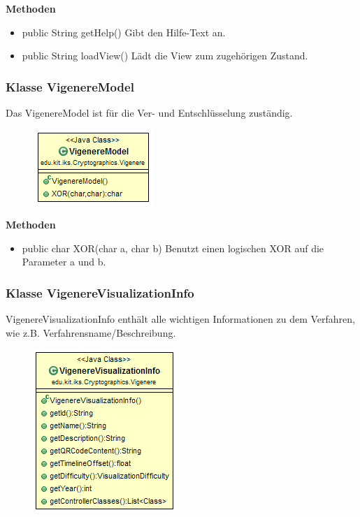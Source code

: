 \documentclass{article}
\begin{document}
      \textbf{Methoden}
      \begin{itemize}
        \item public String getHelp() \newline
        Gibt den Hilfe-Text an.
        \item public String loadView() \newline
        Lädt die View zum zugehörigen Zustand.
      \end{itemize}

    \subsubsection{Klasse VigenereModel}
      Das VigenereModel ist für die Ver- und Entschlüsselung zuständig.
      \begin{figure}[H]
        \centering
        \includegraphics{resources/edu-kit-iks-Cryptographics-Vigenere-VigenereModel}
      \end{figure}
      
      \textbf{Methoden}
      \begin{itemize}
        \item public char XOR(char a, char b) \newline
        Benutzt einen logischen XOR auf die Parameter a und b.
      \end{itemize}

    \subsubsection{Klasse VigenereVisualizationInfo}
      VigenereVisualizationInfo enthält alle wichtigen Informationen zu dem Verfahren, wie z.B. Verfahrensname/Beschreibung.
      \begin{figure}[H]
        \centering
        \includegraphics{resources/edu-kit-iks-Cryptographics-Vigenere-VisualizationInfo}
      \end{figure}
\end{document}
